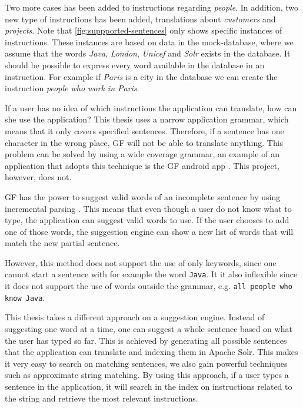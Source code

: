 Two more cases has been added to instructions regarding \emph{people}. In addition, two new type of instructions has been added, translations about \emph{customers} and \emph{projects}. Note that \autoref{fig:suppported-sentences} only shows specific instances of instructions. These instances are based on data in the mock-database, where we assume that the words \emph{Java}, \emph{London}, \emph{Unicef} and \emph{Solr} exists in the database. It should be possible to express every word available in the database in an instruction. For example if \emph{Paris} is a city in the database we can create the instruction \emph{people who work in Paris}.

\label{sec:suggestions}
If a user has no idea of which instructions the application can translate, how can she use the application? This thesis uses a narrow application grammar, which means that it only covers specified sentences. Therefore, if a sentence has one character in the wrong place, GF will not be able to
translate anything. This problem can be solved by using a wide coverage grammar, an example of an application that adopts this technique is the GF android app \cite[p. 41]{angelov2014speech}. This project, however, does not.

GF has the power to suggest valid words of an incomplete sentence by using incremental parsing \cite{angelov09:incremental-parser}. This means that even though a user do not know what to type, the application can suggest valid words to use. If the user chooses to add one of those words, the suggestion engine can show a new list of words that will match the new partial sentence.

However, this method does not support the use of only keywords, since one cannot start a sentence with for example the word \texttt{Java}. It it also inflexible since it does not support the use of words outside the grammar, e.g. \texttt{all people who know Java}.

This thesis takes a different approach on a suggestion engine. Instead of suggesting one word at a time, one can suggest a whole sentence based on what the user has typed so far. This is achieved by generating all possible sentences that the application can translate and indexing them in Apache Solr. This makes it very easy to search on matching sentences, we also gain powerful techniques such as approximate string matching. 
\newline
\newline
By using this approach, if a user types a sentence in the application, it will search in the index on instructions related to the string and retrieve the most relevant instructions.

